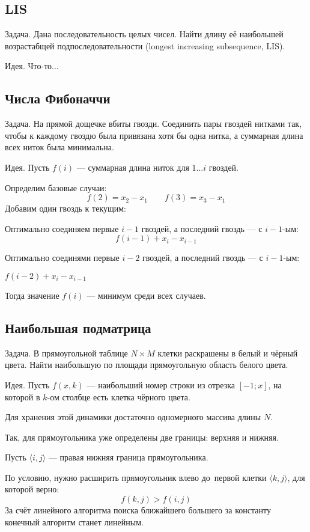 \subsection{LIS}

\begin{theorem}
{\bold Задача.} Дана последовательность целых чисел. Найти длину её наибольшей возрастабщей подпоследовательности {\ital\color{desc}(longest increasing subsequence, LIS)}.
\end{theorem}

{\bold Идея.} Что-то...

\subsection{Числа Фибоначчи}

\begin{theorem}
{\bold Задача.} На прямой дощечке вбиты гвозди. Соединить пары гвоздей нитками так, чтобы к каждому гвоздю была привязана хотя бы одна нитка, а суммарная длина всех ниток была минимальна. 
\end{theorem}

{\bold Идея.} Пусть $f(i)$ --- суммарная длина ниток для $1\dots i$ гвоздей.

Определим базовые случаи:
$$f(2)=x_2-x_1\qquad f(3)=x_3-x_1$$
Добавим один гвоздь к текущим:
\begin{list*}[][\#]
\item Оптимально соединяем первые $i-1$ гвоздей, а последний гвоздь --- с $i-1$-ым:
$$f(i-1)+x_i-x_{i-1}$$
\item Оптимально соединями первые $i-2$ гвоздей, а последний гвоздь --- с $i-1$-ым:

{\centering $f(i-2)+x_i-x_{i-1}$\par}
\end{list*}
Тогда значение $f(i)$ --- {\ital минимум} среди всех случаев.

\subsection{Наибольшая подматрица}

\begin{theorem}
{\bold Задача.} В прямоугольной таблице $N\times M$ клетки раскрашены в белый и чёрный цвета. Найти наибольшую по площади прямоугольную область белого цвета.
\end{theorem}

{\bold Идея.} Пусть $f(x,k)$ --- наибольший номер строки из отрезка $[-1;x]$, на которой в $k$-ом столбце есть клетка {\ital чёрного} цвета.

Для хранения этой динамики достаточно {\ital одномерного} массива длины $N$.

Так, для прямоугольника уже определены {\ital две границы}: верхняя и нижняя.

Пусть $\langle i,j\rangle$ --- правая нижняя граница прямоугольника.

По условию, нужно расширить прямоугольник влево до~{\ital первой} клетки $\langle k,j\rangle$, для которой верно:
$$f(k,j)\greater f(i,j)$$
За счёт линейного алгоритма поиска {\ital ближайшего большего} за константу конечный алгоритм станет {\ital линейным}. 
